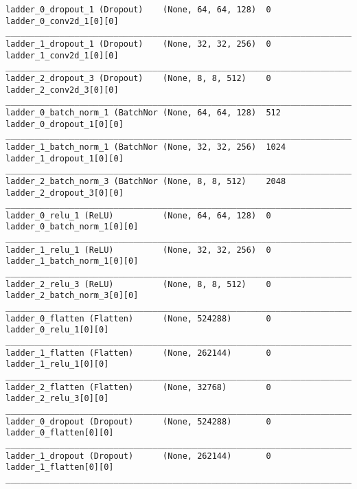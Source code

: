 \begin{lstlisting}[caption={CelebA-VLAE Encoder},captionpos=b,basicstyle=\tiny, label={lst:celeba-vlae-encoder}]
ladder_0_dropout_1 (Dropout)    (None, 64, 64, 128)  0           ladder_0_conv2d_1[0][0]
__________________________________________________________________________________________________
ladder_1_dropout_1 (Dropout)    (None, 32, 32, 256)  0           ladder_1_conv2d_1[0][0]
__________________________________________________________________________________________________
ladder_2_dropout_3 (Dropout)    (None, 8, 8, 512)    0           ladder_2_conv2d_3[0][0]
__________________________________________________________________________________________________
ladder_0_batch_norm_1 (BatchNor (None, 64, 64, 128)  512         ladder_0_dropout_1[0][0]
__________________________________________________________________________________________________
ladder_1_batch_norm_1 (BatchNor (None, 32, 32, 256)  1024        ladder_1_dropout_1[0][0]
__________________________________________________________________________________________________
ladder_2_batch_norm_3 (BatchNor (None, 8, 8, 512)    2048        ladder_2_dropout_3[0][0]
__________________________________________________________________________________________________
ladder_0_relu_1 (ReLU)          (None, 64, 64, 128)  0           ladder_0_batch_norm_1[0][0]
__________________________________________________________________________________________________
ladder_1_relu_1 (ReLU)          (None, 32, 32, 256)  0           ladder_1_batch_norm_1[0][0]
__________________________________________________________________________________________________
ladder_2_relu_3 (ReLU)          (None, 8, 8, 512)    0           ladder_2_batch_norm_3[0][0]
__________________________________________________________________________________________________
ladder_0_flatten (Flatten)      (None, 524288)       0           ladder_0_relu_1[0][0]
__________________________________________________________________________________________________
ladder_1_flatten (Flatten)      (None, 262144)       0           ladder_1_relu_1[0][0]
__________________________________________________________________________________________________
ladder_2_flatten (Flatten)      (None, 32768)        0           ladder_2_relu_3[0][0]
__________________________________________________________________________________________________
ladder_0_dropout (Dropout)      (None, 524288)       0           ladder_0_flatten[0][0]
__________________________________________________________________________________________________
ladder_1_dropout (Dropout)      (None, 262144)       0           ladder_1_flatten[0][0]
__________________________________________________________________________________________________

\end{lstlisting}

